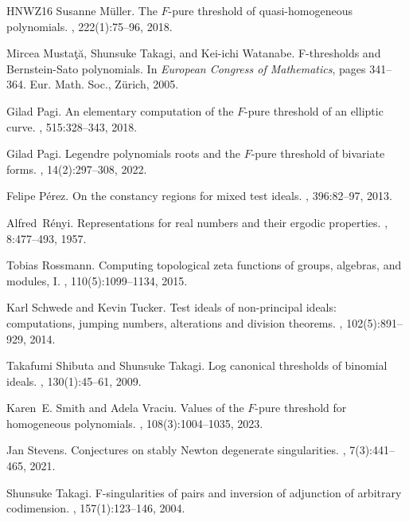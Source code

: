 \documentclass[12pt]{amsart}
\theoremstyle{definition}
\numberwithin{equation}{subsection}
\renewcommand{\!}[1]{{\color{red}\text{\Huge$\star$ }#1}}
\begin{document}
\begin{thebibliography}{HNWZ16}
	Susanne M{\"u}ller.
	\newblock The {$F$}-pure threshold of quasi-homogeneous polynomials.
	, 222(1):75--96, 2018.
	
	Mircea Musta{\c{t}}{\u{a}}, Shunsuke Takagi, and Kei-ichi Watanabe.
	\newblock F-thresholds and {B}ernstein-{S}ato polynomials.
	\newblock In {\em European {C}ongress of {M}athematics}, pages 341--364. Eur.
	Math. Soc., Z\"{u}rich, 2005.
	
	Gilad Pagi.
	\newblock An elementary computation of the {$F$}-pure threshold of an elliptic
	curve.
	, 515:328--343, 2018.
	
	Gilad Pagi.
	\newblock Legendre polynomials roots and the {$F$}-pure threshold of bivariate
	forms.
	, 14(2):297--308, 2022.
	
	Felipe P{\'e}rez.
	\newblock On the constancy regions for mixed test ideals.
	, 396:82--97, 2013.
	
	Alfred~R{\'e}nyi.
	\newblock Representations for real numbers and their ergodic properties.
	, 8:477--493, 1957.
	
	Tobias Rossmann.
	\newblock Computing topological zeta functions of groups, algebras, and
	modules, {I}.
	, 110(5):1099--1134, 2015.
	
	Karl Schwede and Kevin Tucker.
	\newblock Test ideals of non-principal ideals: computations, jumping numbers,
	alterations and division theorems.
	, 102(5):891--929, 2014.
	
	Takafumi Shibuta and Shunsuke Takagi.
	\newblock Log canonical thresholds of binomial ideals.
	, 130(1):45--61, 2009.
	
	Karen~E. Smith and Adela Vraciu.
	\newblock Values of the {$F$}-pure threshold for homogeneous polynomials.
	, 108(3):1004--1035, 2023.
	
	Jan Stevens.
	\newblock Conjectures on stably {N}ewton degenerate singularities.
	, 7(3):441--465, 2021.
	
	Shunsuke Takagi.
	\newblock F-singularities of pairs and inversion of adjunction of arbitrary
	codimension.
	, 157(1):123--146, 2004.
	

\end{thebibliography}
\end{document}
